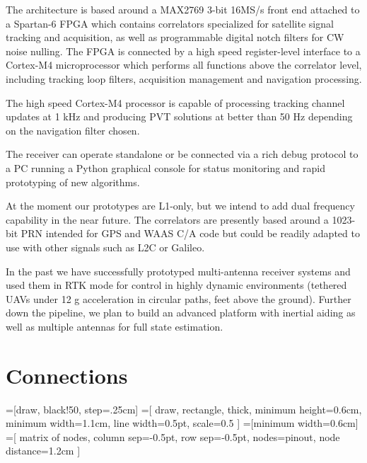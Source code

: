 \documentclass{article}
\begin{document}
\begin{multicols*}{2}
The architecture is based around a MAX2769 3-bit 16MS/s front end
attached to a Spartan-6 FPGA which contains correlators specialized
for satellite signal tracking and acquisition, as well as programmable
digital notch filters for CW noise nulling.  The FPGA is connected by
a high speed register-level interface to a Cortex-M4 microprocessor
which performs all functions above the correlator level, including
tracking loop filters, acquisition management and navigation
processing.

The high speed Cortex-M4 processor is capable of processing tracking
channel updates at 1 kHz and producing PVT solutions at better than 50
Hz depending on the navigation filter chosen.

The receiver can operate standalone or be connected via a rich debug
protocol to a PC running a Python graphical console for status
monitoring and rapid prototyping of new algorithms.

At the moment our prototypes are L1-only, but we intend to add dual
frequency capability in the near future.  The correlators are
presently based around a 1023-bit PRN intended for GPS and WAAS C/A
code but could be readily adapted to use with other signals such as
L2C or Galileo.

In the past we have successfully prototyped multi-antenna receiver systems and
used them in RTK mode for control in highly dynamic environments (tethered
UAVs under 12 g acceleration in circular paths, feet above the ground).
Further down the pipeline, we plan to build an advanced platform with
inertial aiding as well as multiple antennas for full state
estimation.

\end{multicols*}

\section*{Connections}
\usetikzlibrary{backgrounds,matrix}
=[draw, black!50, step=.25cm]
=[
  draw, rectangle, thick,
  minimum height=0.6cm,
  minimum width=1.1cm,
  line width=0.5pt,
  scale=0.5
]
=[minimum width=0.6cm]
=[
  matrix of nodes, 
  column sep=-0.5pt,
  row sep=-0.5pt,
  nodes={pinout},
  node distance=1.2cm
]
\end{document}
